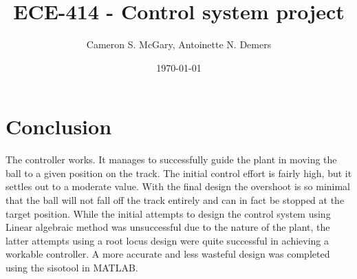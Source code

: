 \documentclass[11pt]{article}	%
\title{ECE-414 - Control system project} %
\author{Cameron S. McGary, Antoinette N. Demers}
\date{\today} 			%
\begin{document}
\maketitle 			%


\thispagestyle{empty} 		%
\clearpage			%

\tableofcontents
\thispagestyle{empty} 		%
\setcounter{page}{0} 		%

\listoffigures
\thispagestyle{empty} 		%
\setcounter{page}{0} 		%

\newpage			%

\clearpage

\clearpage

\clearpage

\clearpage

\clearpage
\section{Conclusion}
The controller works. It manages to successfully guide the plant in moving the ball to a given position on the track. The initial control effort is fairly high, but it settles out to a  moderate value. With the final design the overshoot is so minimal that the ball will not fall off the track entirely and can in fact be stopped at the target position. While the initial attempts to design the control system using Linear algebraic method was unsuccessful due to the nature of the plant, the latter attempts using a root locus design were quite successful in achieving a workable controller. A more accurate and less wasteful design was completed using the sisotool in MATLAB. 
\clearpage

\end{document}
